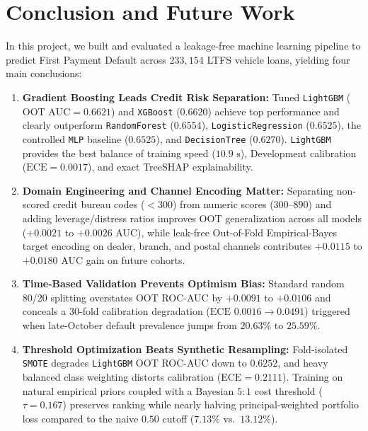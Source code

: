 \section{Conclusion and Future Work}
\label{sec:conclusion}

In this project, we built and evaluated a leakage-free machine learning pipeline to predict First Payment Default across $233{,}154$ LTFS vehicle loans, yielding four main conclusions:

\begin{enumerate}[itemsep=1pt,topsep=2pt]
  \item \textbf{Gradient Boosting Leads Credit Risk Separation:} Tuned \texttt{LightGBM} ($\text{OOT AUC} = 0.6621$) and \texttt{XGBoost} ($0.6620$) achieve top performance and clearly outperform \texttt{RandomForest} ($0.6554$), \texttt{LogisticRegression} ($0.6525$), the controlled \texttt{MLP} baseline ($0.6525$), and \texttt{DecisionTree} ($0.6270$). \texttt{LightGBM} provides the best balance of training speed ($10.9\text{ s}$), Development calibration ($\text{ECE} = 0.0017$), and exact TreeSHAP explainability.
  \item \textbf{Domain Engineering and Channel Encoding Matter:} Separating non-scored credit bureau codes ($<300$) from numeric scores ($300\text{--}890$) and adding leverage/distress ratios improves OOT generalization across all models ($+0.0021$ to $+0.0026$ AUC), while leak-free Out-of-Fold Empirical-Bayes target encoding on dealer, branch, and postal channels contributes $+0.0115$ to $+0.0180$ AUC gain on future cohorts.
  \item \textbf{Time-Based Validation Prevents Optimism Bias:} Standard random 80/20 splitting overstates OOT ROC-AUC by $+0.0091$ to $+0.0106$ and conceals a $30$-fold calibration degradation ($\text{ECE } 0.0016 \to 0.0491$) triggered when late-October default prevalence jumps from $20.63\%$ to $25.59\%$.
  \item \textbf{Threshold Optimization Beats Synthetic Resampling:} Fold-isolated \texttt{SMOTE} degrades \texttt{LightGBM} OOT ROC-AUC down to $0.6252$, and heavy balanced class weighting distorts calibration ($\text{ECE} = 0.2111$). Training on natural empirical priors coupled with a Bayesian $5{:}1$ cost threshold ($\tau = 0.167$) preserves ranking while nearly halving principal-weighted portfolio loss compared to the naive $0.50$ cutoff ($7.13\%$ vs.\ $13.12\%$).
\end{enumerate}

